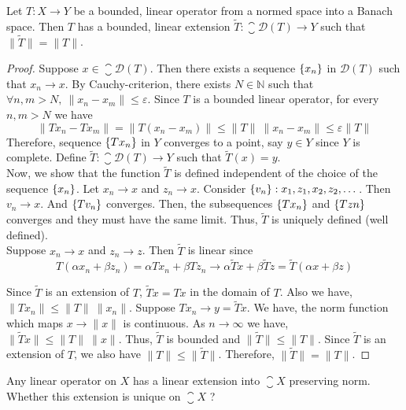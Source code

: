 \begin{theorem}
	Let $T : X \to Y$ be a bounded, linear operator from a normed space into a Banach space.
	Then $T$ has a bounded, linear extension $\tilde{T} : \closure{\mathscr{D}(T)} \to Y$ such that $\|\tilde{T}\| = \|T\|$.
\end{theorem}
\begin{proof}
	Suppose $x \in \closure{\mathscr{D}(T)}$.
	Then there exists a sequence $\left\{x_n\right\}$ in $\mathscr{D}(T)$ such that $x_n \to x$.
	By Cauchy-criterion, there exists $N \in \mathbb{N}$ such that $\forall n,m > N,\ \|x_n - x_m\| \le \varepsilon$.
	Since $T$ is a bounded linear operator, for every $n,m > N$ we have
	\[ \|Tx_n - Tx_m\| = \|T(x_n-x_m)\| \le \|T\| \ \|x_n-x_m\| \le \varepsilon \|T\| \]
	Therefore, sequence $\left\{Tx_n\right\}$ in $Y$ converges to a point, say $y \in Y$ since $Y$ is complete.
	Define $\tilde{T} : \closure{\mathscr{D}(T)} \to Y$ such that $\tilde{T}(x) = y$.\\

	Now, we show that the function $\tilde{T}$ is defined independent of the choice of the sequence $\left\{x_n\right\}$.
	Let $x_n \to x$ and $z_n \to x$.
	Consider $\left\{v_n\right\} : x_1,z_1,x_2,z_2,\dots$.
	Then $v_n \to x$.
	And $\left\{Tv_n\right\}$ converges.
	Then, the subsequences $\left\{Tx_n\right\}$ and $\left\{Tzn\right\}$ converges and they must have the same limit.
	Thus, $\tilde{T}$ is uniquely defined (well defined).\\

	Suppose $x_n \to x$ and $z_n \to z$.
	Then $\tilde{T}$ is linear since 
	\[ T(\alpha x_n + \beta z_n) = \alpha Tx_n + \beta Tz_n \to \alpha \tilde{T}x + \beta \tilde{T}z = \tilde{T}(\alpha x + \beta z) \]

	Since $\tilde{T}$ is an extension of $T$, $\tilde{T}x = Tx$ in the domain of $T$.
	Also we have, $\|Tx_n\| \le \|T\|\ \|x_n\|$.
	Suppose $Tx_n \to y = \tilde{T}x$.
	We have, the norm function which maps $x \to \|x\|$ is continuous.
	As $n \to \infty$ we have, $\| \tilde{T}x \| \le \|T\|\ \|x\|$.
	Thus, $\tilde{T}$ is bounded and $\|\tilde{T}\| \le \|T\|$.
	Since $\tilde{T}$ is an extension of $T$, we also have $\|T\| \le \| \tilde{T}\|$.
	Therefore, $\|\tilde{T}\| = \|T\|$.
\end{proof}

\begin{challenge}
	Any linear operator on $X$ has a linear extension into $\closure{X}$ preserving norm.
	Whether this extension is unique on $\closure{X}$ ?
\end{challenge}


